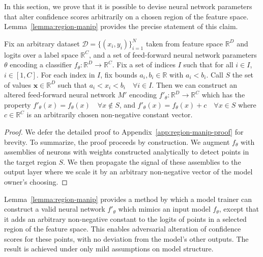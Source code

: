In this section, we prove that it is possible to devise neural network parameters that alter confidence scores arbitrarily on a chosen region of the feature space. Lemma~\ref{lemma:region-manip} provides the precise statement of this claim.

\sloppy
\begin{lemma} \label{lemma:region-manip}
     Fix an arbitrary dataset $\mathcal{D}=\{(x_i, y_i)\}^{N}_{i=1}$ taken from feature space $\mathbb{R}^D$ and logits over a label space $\mathbb{R}^{C}$, and a set of feed-forward neural network parameters $\theta$ encoding a classifier $f_{\theta}: \mathbb{R}^D \to \mathbb{R}^C$. Fix a set of indices $I$ such that for all $i \in I$, $i \in [1, C]$. For each index in $I$, fix bounds $a_i, b_i \in \mathbb{R}$ with $a_i < b_i$. Call $S$ the set of values $\mathbf{x} \in \mathbb{R}^D$ such that $a_i < x_i < b_i \quad \forall i \in I$. Then we can construct an altered feed-forward neural network $M'$ encoding $f'_{\theta}: \mathbb{R}^D \to \mathbb{R}^C$ which has the property $f'_{\theta}(x) = f_{\theta}(x) \quad \forall x \notin S$, and $f'_\theta(x)=f_\theta(x) + c \quad \forall x \in S$ where $c \in \mathbb{R}^C$ is an arbitrarily chosen non-negative constant vector.
\end{lemma} 

\begin{proof} We defer the detailed proof to Appendix~\ref{app:region-manip-proof} for brevity. To summarize, the proof proceeds by construction. We augment $f_{\theta}$ with assemblies of neurons with weights constructed analytically to detect points in the target region $S$. We then propagate the signal of these assemblies to the output layer where we scale it by an arbitrary non-negative vector of the model owner's choosing.
\end{proof}

Lemma~\ref{lemma:region-manip} provides a method by which a model trainer can construct a valid neural network $f'_{\theta}$ which mimics an input model $f_{\theta}$, except that it adds an arbitrary non-negative constant to the logits of points in a selected region of the feature space. This enables adversarial alteration of confidence scores for these points, with no deviation from the model's other outputs. The result is achieved under only mild assumptions on model structure.


